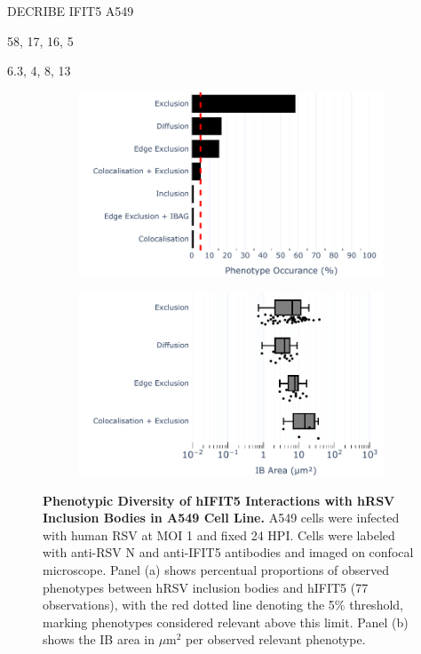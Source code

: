DECRIBE IFIT5 A549

58, 17, 16, 5

6.3, 4, 8, 13

\begin{figure}
    \begin{subfigure}{0.495\textwidth}
        \caption{}
        \includegraphics[width=1\linewidth]{08. Chapter 3/Figs/02. Infection/04. IFIT5/01. bar_i5_a549.pdf} 
    \end{subfigure}
    \begin{subfigure}{0.495\textwidth}
        \caption{}
        \includegraphics[width=1\linewidth]{08. Chapter 3/Figs/02. Infection/04. IFIT5/02. box_i5_a549.pdf}
    \end{subfigure}
    \caption[Phenotypic Diversity of hIFIT5 Interactions with hRSV Inclusion Bodies in A549 Cell Line.]{\textbf{Phenotypic Diversity of hIFIT5 Interactions with hRSV Inclusion Bodies in A549 Cell Line.} A549 cells were infected with human RSV at MOI 1 and fixed 24 HPI. Cells were labeled with anti-RSV N and anti-IFIT5 antibodies and imaged on confocal microscope. Panel (a) shows percentual proportions of observed phenotypes between hRSV inclusion bodies and hIFIT5 (77 observations), with the red dotted line denoting the 5\% threshold, marking phenotypes considered relevant above this limit. Panel (b) shows the IB area in \(\mu \mbox{m}^2\) per observed relevant phenotype.}
    \label{fig:Phenotypic Diversity of hIFIT5 Interactions with hRSV Inclusion Bodies in A549 Cell Line}
\end{figure}


